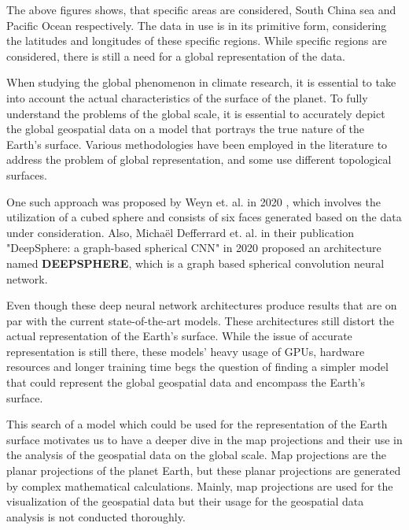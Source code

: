 The above figures shows, that specific areas are considered, South China sea and Pacific Ocean respectively. The data in use is in its primitive form, considering the
latitudes and longitudes of these specific regions. While specific regions are considered, there is still a need for a global representation of the data.

When studying the global phenomenon in climate research, it is essential to take into account the actual characteristics of the surface of the planet. To fully understand
the problems of the global scale, it is essential to accurately depict the global geospatial data on a model that portrays the true nature of the Earth's surface.
Various methodologies have been employed in the literature to address the problem of global representation, and some use different topological surfaces.

One such approach was proposed by Weyn et. al. in 2020 \cite{Weyn_2020}, which involves the utilization of a cubed sphere and consists of six faces generated based on the data
under consideration.
Also, Micha{\"{e}}l Defferrard et. al. in their publication "DeepSphere: a graph-based spherical {CNN}" in 2020 \cite{DBLP:journals/corr/abs-2012-15000} proposed
an architecture named \textbf{DEEPSPHERE}, which is a graph based spherical convolution neural network.

Even though these deep neural network architectures produce results that are on par with the current state-of-the-art models. These architectures still distort the actual
representation of the Earth's surface.
While the issue of accurate representation is still there, these models' heavy usage of GPUs, hardware resources and longer training time begs the question of finding a simpler
model that could represent the global geospatial data and encompass the Earth's surface.

This search of a model which could be used for the representation of the Earth surface motivates us to have a deeper dive in the map projections and their use
in the analysis of the geospatial data on the global scale.
Map projections are the planar projections of the planet Earth, but these planar projections are generated by complex mathematical calculations.
Mainly, map projections are used for the visualization of the geospatial data but their usage for the geospatial data analysis is not conducted thoroughly.


